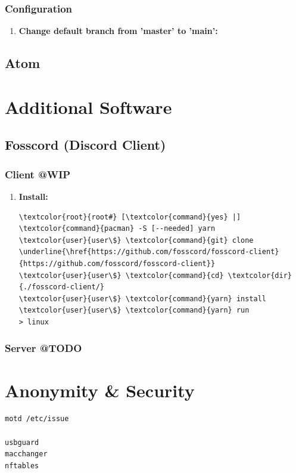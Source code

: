 \documentclass[10pt, a4paper, onecolumn, oneside, titlepage, openany]{book}
\begin{document}
\subsection{Configuration}
\begin{enumerate}
    \item \textbf{Change default branch from 'master' to 'main':}
\end{enumerate}

\section{Atom}

\chapter{Additional Software}
\section{Fosscord (Discord Client)}
\subsection{Client @WIP}
\begin{enumerate}
    \item \textbf{Install:}
\begin{Verbatim}[commandchars=\\\{\}]
\textcolor{root}{root#} [\textcolor{command}{yes} |] \textcolor{command}{pacman} -S [--needed] yarn
\textcolor{user}{user\$} \textcolor{command}{git} clone \underline{\href{https://github.com/fosscord/fosscord-client}{https://github.com/fosscord/fosscord-client}}
\textcolor{user}{user\$} \textcolor{command}{cd} \textcolor{dir}{./fosscord-client/}
\textcolor{user}{user\$} \textcolor{command}{yarn} install
\textcolor{user}{user\$} \textcolor{command}{yarn} run
> linux
\end{Verbatim}        
\end{enumerate}
\subsection{Server @TODO}


\chapter{Anonymity \& Security}
\begin{Verbatim}[commandchars=\\\{\}]
motd /etc/issue

usbguard
macchanger
nftables

\end{Verbatim}
\end{document}
